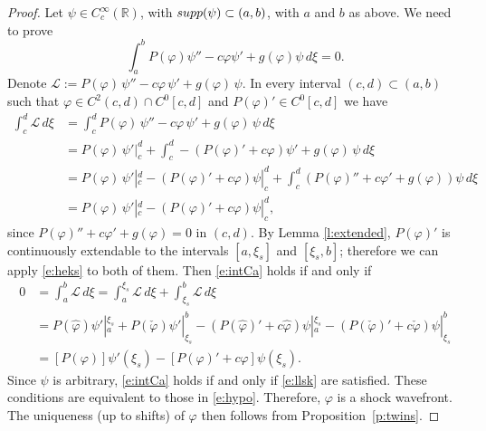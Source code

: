 \documentclass[10pt,a4paper]{amsart}
\renewcommand{\phi}{\varphi}
\begin{document}
\begin{proof}
Let $\psi \in C^\infty_c(\mathbb R)$, with ${\rm supp}(\psi)\subset (a,b)$, with $a$ and $b$ as above. We need to prove 
 \begin{equation}
 \label{e:intCa}
 \int_a^b P(\varphi)\psi''-c\varphi \psi' +g(\varphi)\psi\,d\xi = 0.
 \end{equation}
Denote $\mathcal L:= P(\varphi)\, \psi'' - c \varphi \,\psi' +g(\varphi)\,\psi$.
In every interval $(c,d)\subset(a,b)$ such that $\varphi \in C^2(c,d)\cap C^0[c,d]$ and $P(\varphi)' \in C^0[c,d]$  we have
\begin{align}
\int_c^d \mathcal L\,d\xi &= \int_c^d P(\varphi)\, \psi'' - c \varphi \,\psi' +g(\varphi)\,\psi\,d\xi
\nonumber
\\
&= P(\varphi)\,\psi'|^d_c + \int_c^d  -\left(P(\varphi)' +c\varphi\right)\psi' +g(\varphi)\,\psi\,d\xi 
\nonumber
\\
&= P(\varphi)\,\psi'|^d_c -\left(P(\varphi)'+c\varphi\right)\psi|^d_c+\int_c^d  \left(P(\varphi)''+c\varphi' +g(\varphi)\right)\psi\,d\xi
\nonumber
\\
&= P(\varphi)\,\psi'|^d_c -\left(P(\varphi)'+c\varphi\right)\psi|^d_c,
\label{e:heks}
\end{align}
since $P(\varphi)''+c\varphi' +g(\varphi)=0$ in $(c,d)$. By Lemma \ref{l:extended}, $P(\varphi)'$ is continuously extendable to the intervals $[a,\xi_s]$ and $[\xi_s,b]$; therefore we can apply \eqref{e:heks} to both of them. Then \eqref{e:intCa} holds if and only if
\begin{equation*}
\begin{aligned}
0&=\int_a^b \mathcal L \, d\xi  = \int_a^{\xi_s} \mathcal L \,d\xi+ \int_{\xi_s}^b \mathcal L\,d\xi
\\
&= P(\hat\varphi)\psi'|_a^{\xi_s} + P(\check\varphi)\psi'|_{\xi_s}^b
-\left(P(\hat\varphi)'+c\hat\varphi\right)\psi|_a^{\xi_s} - \left(P(\check\varphi)'+c\check\varphi\right)\psi|_{\xi_s}^b
\\
&=[P(\varphi)]\psi'(\xi_s)-\left[P(\varphi)'+c\varphi\right]\psi(\xi_s).
\end{aligned}
\end{equation*}
Since $\psi$ is arbitrary, \eqref{e:intCa} holds if and only if  \eqref{e:llsk} are satisfied. These conditions are equivalent to those in  \eqref{e:hypo}. Therefore, $\phi$ is a shock wavefront. The uniqueness (up to shifts) of $\phi$ then follows from Proposition~\ref{p:twins}.
\end{proof}
\end{document}
